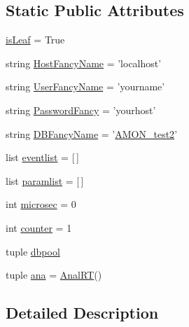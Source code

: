 \subsection*{Static Public Attributes}
\begin{DoxyCompactItemize}
\item 
\hyperlink{classnetwork_1_1amon__server__post_1_1_event_page_a2c4039685dcc225adc4c2a998ebdbc97}{is\-Leaf} = True
\item 
string \hyperlink{classnetwork_1_1amon__server__post_1_1_event_page_ab2d4c291eb38394dd80dc0da415bc8f7}{Host\-Fancy\-Name} = 'localhost'
\item 
string \hyperlink{classnetwork_1_1amon__server__post_1_1_event_page_a99e287cd9a0c3fa9663a18101606fe7c}{User\-Fancy\-Name} = 'yourname'
\item 
string \hyperlink{classnetwork_1_1amon__server__post_1_1_event_page_abf3ce23699c9adfa3508cda1192998c1}{Password\-Fancy} = 'yourhost'
\item 
string \hyperlink{classnetwork_1_1amon__server__post_1_1_event_page_ab13a95bbc99fa0136f178e8dfb59a32d}{D\-B\-Fancy\-Name} = '\hyperlink{db__mc__build_8sql_a19c21c59303d8b6591b92240ff7de1d5}{A\-M\-O\-N\-\_\-test2}'
\item 
list \hyperlink{classnetwork_1_1amon__server__post_1_1_event_page_a758c79966f818aa356316d87052f9c2e}{eventlist} = \mbox{[}$\,$\mbox{]}
\item 
list \hyperlink{classnetwork_1_1amon__server__post_1_1_event_page_a11cfef0e995347ffe8571f8be4dbc41a}{paramlist} = \mbox{[}$\,$\mbox{]}
\item 
int \hyperlink{classnetwork_1_1amon__server__post_1_1_event_page_ac1ec0da9b3424978570e5327b65cbbcc}{microsec} = 0
\item 
int \hyperlink{classnetwork_1_1amon__server__post_1_1_event_page_aa2d1165df8829699de38f4047d8d9b3c}{counter} = 1
\item 
tuple \hyperlink{classnetwork_1_1amon__server__post_1_1_event_page_a27945808b5c4a8cdcde134a10df4965d}{dbpool}
\item 
tuple \hyperlink{classnetwork_1_1amon__server__post_1_1_event_page_acba345bc67164b2162236da6498a94f5}{ana} = \hyperlink{classanalyser_1_1runanal_1_1_anal_r_t}{Anal\-R\-T}()
\end{DoxyCompactItemize}


\subsection{Detailed Description}


